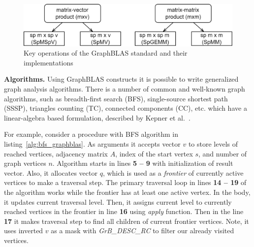 \begin{figure}[h]
    \centering
    \includegraphics[width=1.0\textwidth]{images/types_of_operations.png}
    \caption{Key operations of the GraphBLAS standard and their implementations}
    \label{fig:gb_ops}
\end{figure}

\textbf{Algorithms.} Using GraphBLAS constructs it is possible to write generalized graph analysis algorithms. There is a number of common and well-known graph algorithms, such as breadth-first search (BFS), single-source shortest path (SSSP), triangles counting (TC), connected components (CC), etc. which have a linear-algebra based formulation, described by Kepner et al.~\cite{misc:la_graph}.

For example, consider a procedure with BFS algorithm in listing~\ref{alg:bfs_graphblas}. As arguments it accepts vector $v$ to store levels of reached vertices, adjacency matrix $A$, index of the start vertex $s$, and number of graph vertices $n$. Algorithm starts in lines \textbf{5 -- 9} with initialization of result vector. Also, it allocates vector $q$, which is used as a \textit{frontier} of currently active vertices to make a traversal step. The primary traversal loop in lines \textbf{14 -- 19} of the algorithm works while the frontier has at least one active vertex. In the body, it updates current traversal level. Then, it assigns current level to currently reached vertices in the frontier in line \textbf{16} using \textit{apply} function. Then in the line \textbf{17} it makes traversal step to find all children of current frontier vertices. Note, it uses inverted $v$ as a mask with \textit{GrB\_DESC\_RC} to filter our already visited vertices.

\lstset{style=codelistingstyle}

